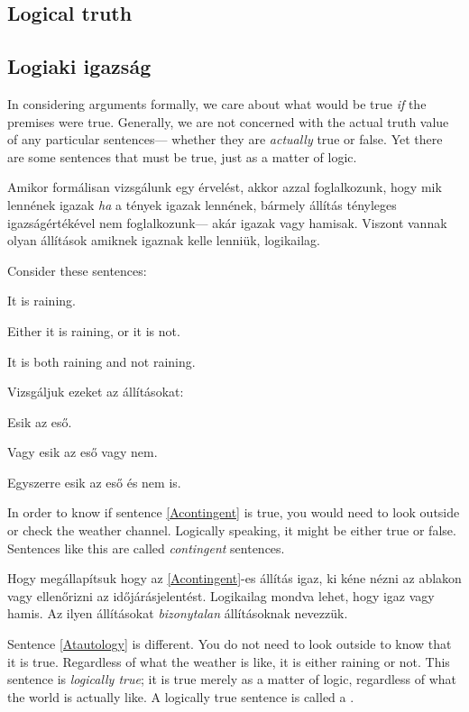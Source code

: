 \subsection*{Logical truth}
\subsection{Logiaki igazság}

In considering arguments formally, we care about what would be true \emph{if} the premises were true. Generally, we are not concerned with the actual truth value of any particular sentences--- whether they are \emph{actually} true or false. Yet there are some sentences that must be true, just as a matter of logic.

Amikor formálisan vizsgálunk egy érvelést, akkor azzal foglalkozunk, hogy mik lennének igazak \emph{ha} a tények igazak lennének, bármely állítás tényleges igazságértékével nem foglalkozunk--- akár igazak vagy hamisak. Viszont vannak olyan állítások amiknek igaznak kelle lenniük, logikailag.

Consider these sentences:
\begin{earg}
\item[\ex{Acontingent}] It is raining.
\item[\ex{Atautology}] Either it is raining, or it is not.
\item[\ex{Acontradiction}] It is both raining and not raining.
\end{earg}

Vizsgáljuk ezeket az állításokat:
\begin{earg}
\item[\ex{Acontingent}] Esik az eső.
\item[\ex{Atautology}] Vagy esik az eső vagy nem.
\item[\ex{Acontradiction}] Egyszerre esik az eső és nem is.
\end{earg}

In order to know if sentence \ref{Acontingent} is true, you would need to look outside or check the weather channel. Logically speaking, it might be either true or false. Sentences like this are called \emph{contingent} sentences.

Hogy megállapítsuk hogy az \ref{Acontingent}-es állítás igaz, ki kéne nézni az ablakon vagy ellenőrizni az időjárásjelentést. Logikailag mondva lehet, hogy igaz vagy hamis. Az ilyen állításokat \emph{bizonytalan} állításoknak nevezzük.
 
Sentence \ref{Atautology} is different. You do not need to look outside to know that it is true. Regardless of what the weather is like, it is either raining or not. This sentence is \emph{logically true}; it is true merely as a matter of logic, regardless of what the world is actually like. A logically true sentence is called a .

